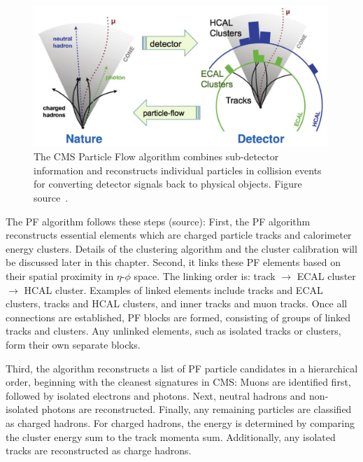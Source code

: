 \begin{figure}[t!]
\centering
\includegraphics[width=0.99\textwidth]{figures/PF.png}
\caption[PF translate detector information]{The CMS Particle Flow algorithm combines sub-detector information and reconstructs individual
particles in collision events for converting detector signals back to physical objects. Figure source~\cite{PF_diagram}.}
\label{fig:PF_diagram}
\end{figure}

The PF algorithm follows these steps (source):
First, the PF algorithm reconstructs essential elements which are charged particle tracks and calorimeter energy clusters.
Details of the clustering algorithm and the cluster calibration will be discussed later in this chapter.
Second, it links these PF elements based on their spatial proximity in $\eta$-$\phi$ space.
The linking order is: track $\rightarrow$ ECAL cluster $\rightarrow$ HCAL cluster.
Examples of linked elements include tracks and ECAL clusters, tracks and HCAL clusters, and inner tracks and muon tracks.
Once all connections are established, PF blocks are formed, consisting of groups of linked tracks and clusters.
Any unlinked elements, such as isolated tracks or clusters, form their own separate blocks.

Third, the algorithm reconstructs a list of PF particle candidates in a hierarchical order, beginning with the cleanest signatures in CMS:
Muons are identified first, followed by isolated electrons and photons. Next, neutral hadrons and non-isolated photons are reconstructed.
Finally, any remaining particles are classified as charged hadrons.
For charged hadrons, the energy is determined by comparing the cluster energy sum to the track momenta sum.
Additionally, any isolated tracks are reconstructed as charge hadrons.

